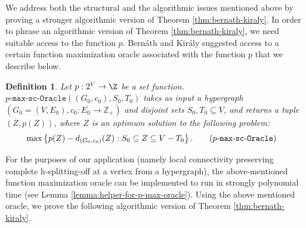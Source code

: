 \documentclass{article}
\newtheorem{definition}{Definition}[section]
\newcommand{\functionMaximizationOracleStrongCover}[1]{\ensuremath{{#1}\text{-}\mathtt{max}\text{-}\mathtt{sc}\text{-}\mathtt{Oracle}}\xspace}
\begin{document}
We address both the structural and the algorithmic issues mentioned above by proving a stronger algorithmic 
version of Theorem \ref{thm:bernath-kiraly}. 
In order to phrase an algorithmic version of Theorem \ref{thm:bernath-kiraly}, we need suitable access to the function $p$. Bern\'{a}th and Kir\'{a}ly \cite{Bernath-Kiraly} suggested access to a certain function maximization oracle associated with the function $p$ that we describe below. 

\begin{definition}
    Let $p: 2^V\rightarrow \Z$ be a set function.    $\functionMaximizationOracleStrongCover{p}\left(\left(G_0, c_0\right), S_0, T_0\right)$ takes as input a hypergraph $(G_0=(V, E_0), c_0: E_0\rightarrow \mathbb{Z}_{+})$ and disjoint sets $S_0, T_0\subseteq V$, and returns a tuple $(Z, p(Z))$, where $Z$ is an optimum solution to the following problem:
        \begin{align*}
        \max & \left\{p(Z)-d_{(G_0, c_0)}(Z): S_0\subseteq Z\subseteq V-T_0\right\}. \tag{\functionMaximizationOracleStrongCover{p}}\label{tag:maximization-oracle-strong-cover}
        \end{align*}
\end{definition}
For the purposes of our application (namely local connectivity preserving complete h-splitting-off at a vertex from a hypergraph), the above-mentioned function maximization oracle can be implemented to run in strongly polynomial time (see Lemma \ref{lemma:helper-for-p-max-oracle}). Using the above mentioned oracle, we prove the following algorithmic version of Theorem \ref{thm:bernath-kiraly}.
\end{document}
